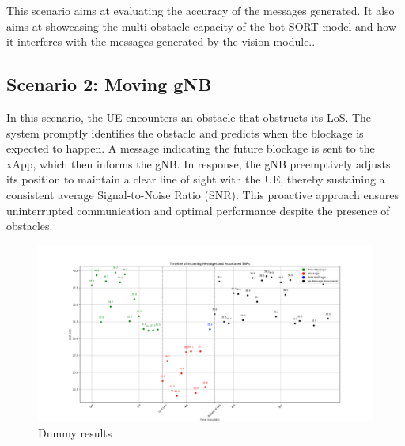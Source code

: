 This scenario aims at evaluating the accuracy of the messages generated.
It also aims at showcasing the multi obstacle capacity of the bot-SORT model and how it interferes with the messages generated by the vision module..

\subsection{Scenario 2: Moving gNB}\label{subsec:scenario-1:-moving-gnb}
In this scenario, the UE encounters an obstacle that obstructs its LoS. %
The system promptly identifies the obstacle and predicts when the blockage is expected to happen.
A message indicating the future blockage is sent to the xApp, which then informs the gNB.
In response, the gNB preemptively adjusts its position to maintain a clear line of sight with the UE, thereby sustaining a consistent average Signal-to-Noise Ratio (SNR). This proactive approach ensures uninterrupted communication and optimal performance despite the presence of obstacles.

\begin{figure}[H]
    \centering
    \includegraphics[width=\linewidth]{figures/dummy results}
    \caption{Dummy results}
    \label{fig:results_2}
\end{figure}




